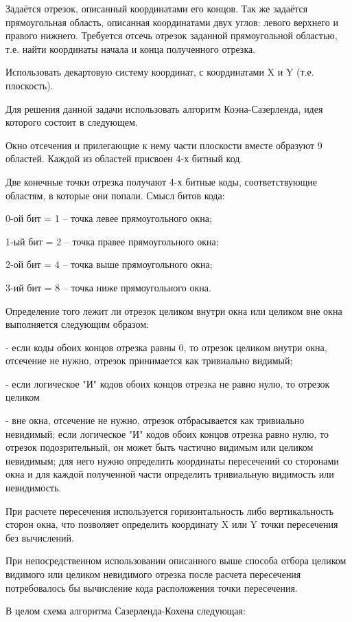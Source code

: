 Задаётся отрезок, описанный координатами его концов. Так же задаётся прямоугольная область, описанная координатами двух углов: левого верхнего и правого нижнего. Требуется отсечь отрезок заданной прямоугольной областью, т.е. найти координаты начала и конца полученного отрезка.

Использовать декартовую систему координат, с координатами X и Y (т.е. плоскость).

Для решения данной задачи использовать алгоритм Коэна-Сазерленда, идея которого состоит в следующем.

Окно отсечения и прилегающие к нему части плоскости вместе образуют  9 областей. Каждой из областей присвоен 4-х битный код. 

Две конечные точки отрезка получают 4-х битные коды, соответствующие областям, в которые они попали. Смысл битов кода: 

0-ой бит = 1 –  точка левее прямоугольного окна; 

1-ый бит = 2 –  точка правее прямоугольного окна; 

2-ой бит = 4 –  точка выше прямоугольного окна; 

3-ий бит = 8 –  точка ниже прямоугольного окна. 

Определение того лежит ли отрезок целиком внутри окна или целиком вне окна выполняется следующим образом: 

 - если коды обоих концов отрезка равны 0, то отрезок целиком внутри окна, отсечение не нужно, отрезок принимается как тривиально видимый;

 - если логическое "И" кодов обоих концов отрезка не равно нулю, то отрезок целиком

 - вне окна, отсечение не нужно, отрезок отбрасывается как тривиально невидимый;
если логическое "И" кодов обоих концов отрезка равно нулю, то отрезок подозрительный, он может быть частично видимым или целиком невидимым; для него нужно определить координаты пересечений со сторонами окна и для каждой полученной части определить тривиальную видимость или невидимость. 

При расчете пересечения используется горизонтальность либо вертикальность сторон окна, что позволяет определить координату X или Y точки пересечения без вычислений. 

При непосредственном использовании описанного выше способа отбора целиком видимого или целиком невидимого отрезка после расчета пересечения потребовалось бы вычисление кода расположения точки пересечения. 

В целом схема алгоритма Сазерленда-Кохена следующая: 

